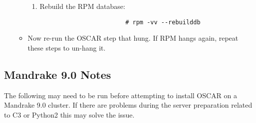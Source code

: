 \begin{itemize}
\begin{itemize}
\begin{enumerate}
				\item Rebuild the RPM database:
					\begin{verbatim}
						# rpm -vv --rebuilddb
					\end{verbatim}
			\end{enumerate}

		\item Now re-run the OSCAR step that hung.  If RPM hangs again,
		repeat these steps to un-hang it.
	\end{itemize}

\end{itemize}




\subsection{Mandrake 9.0 Notes}
\label{subsec:mdk90notes}

The following may need to be run before attempting to install OSCAR on a
Mandrake 9.0 cluster.  If there are problems during the server preparation
related to C3 or Python2 this may solve the issue.

